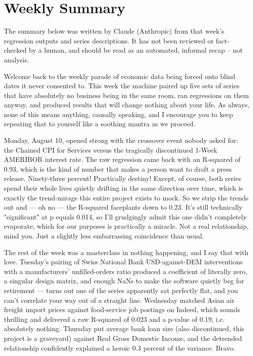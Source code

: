\section{Weekly Summary}

\begin{tcolorbox}[colback=yellow!10,colframe=black!50,title=AI-Generated Content]
\noindent The summary below was written by Claude (Anthropic) from that week's regression outputs and series descriptions. It has not been reviewed or fact-checked by a human, and should be read as an automated, informal recap -- not analysis.
\end{tcolorbox}

Welcome back to the weekly parade of economic data being forced onto blind dates it never consented to. This week the machine paired up five sets of series that have absolutely no business being in the same room, ran regressions on them anyway, and produced results that will change nothing about your life. As always, none of this means anything, causally speaking, and I encourage you to keep repeating that to yourself like a soothing mantra as we proceed.

Monday, August 10, opened strong with the crossover event nobody asked for: the Chained CPI for Services versus the tragically discontinued 1-Week AMERIBOR interest rate. The raw regression came back with an R-squared of 0.93, which is the kind of number that makes a person want to draft a press release. Ninety-three percent! Practically destiny! Except, of course, both series spend their whole lives quietly drifting in the same direction over time, which is exactly the trend-mirage this entire project exists to mock. So we strip the trends out and — oh no — the R-squared faceplants down to 0.23. It's still technically "significant" at p equals 0.014, so I'll grudgingly admit this one didn't completely evaporate, which for our purposes is practically a miracle. Not a real relationship, mind you. Just a slightly less embarrassing coincidence than usual.

The rest of the week was a masterclass in nothing happening, and I say that with love. Tuesday's pairing of Swiss National Bank USD-against-DEM interventions with a manufacturers' unfilled-orders ratio produced a coefficient of literally zero, a singular design matrix, and enough NaNs to make the software quietly beg for retirement — turns out one of the series apparently sat perfectly flat, and you can't correlate your way out of a straight line. Wednesday matched Asian air freight import prices against food-service job postings on Indeed, which sounds thrilling and delivered a raw R-squared of 0.023 and a p-value of 0.19, i.e. absolutely nothing. Thursday put average bank loan size (also discontinued, this project is a graveyard) against Real Gross Domestic Income, and the detrended relationship confidently explained a heroic 0.3 percent of the variance. Bravo.

